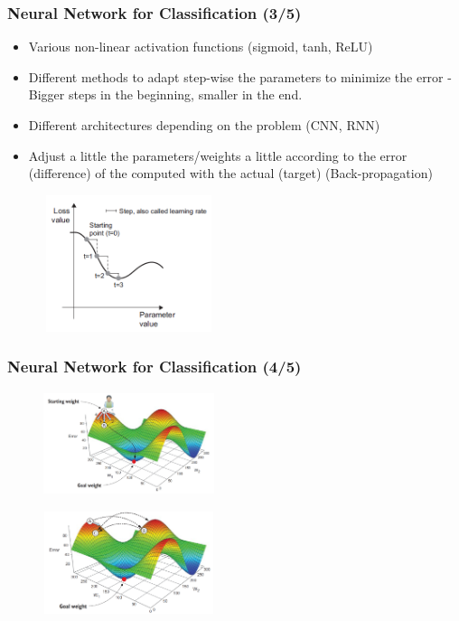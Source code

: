 \documentclass{beamer}
\begin{document}
\begin{frame}
\frametitle{Neural Network for Classification (3/5)}

\begin{itemize}
\item Various non-linear activation functions (sigmoid, tanh, ReLU)
\item Different methods to adapt step-wise the parameters to minimize the error - 
Bigger steps in the beginning, smaller in the end.
\item Different architectures depending on the problem (CNN, RNN)
\item Adjust a little the parameters/weights a little according to the error (difference) of the computed with the actual (target)
(Back-propagation)
\end{itemize}

\begin{figure}
  \includegraphics[width=5cm, height=4cm]{figures/GradientDescent.png}
\end{figure}

\end{frame}
\begin{frame}
\frametitle{Neural Network for Classification (4/5)}

\begin{figure}
  \includegraphics[width=5cm, height=3cm]{figures/GD_1.png}
\end{figure}

\begin{figure}
  \includegraphics[width=5cm, height=3cm]{figures/GD_2.png}
\end{figure}

\end{frame}
\end{document}
